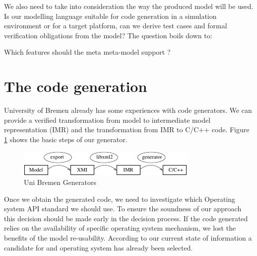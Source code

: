 \documentclass[11pt, a4paper]{article}
\begin{document}
We also need to take into consideration the way the produced model will be used. 
Is our modelling language suitable for code generation in a simulation environment or  for a target platform, can we derive test cases and formal verification obligations from the model? 
The question boils down to: 
\begin{center}
Which features should the meta meta-model support ?
\end{center}


\section{The code generation}
\label{sec:codegeneration}
University of Bremen  already has some experiences with code generators. We can provide a
verified transformation from  model to intermediate model representation
(IMR) and the transformation from IMR to C/C++ code. Figure \ref{fig:generator}
shows the basic steps of our generator.  
\begin{figure}[htbp]
\includegraphics[width=\textwidth]{code_generator.pdf}
\caption{Uni Bremen Generators}
\label{fig:generator}
\end{figure}


Once we obtain the generated code, we need to investigate which Operating
system API standard  we should use. To ensure the soundness of our approach this
decision should be made early in the decision process. If the code generated
relies on the availability of specific operating system mechanism, we lost the
benefits of the model re-usability. According to our current state of information a candidate for 
and operating system has already been selected.
\end{document}
